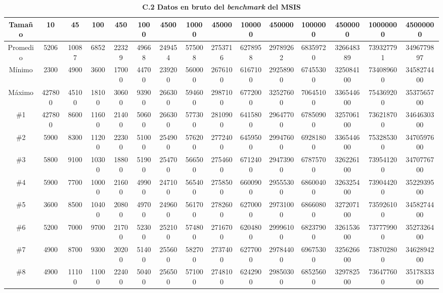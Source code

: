 \documentclass[titlepage]{article}
\begin{document}
\begin{landscape}
	\begin{table}[h]
		\centering
		\smaller
		\caption*{\textbf{C.2 Datos en bruto del \textit{benchmark} del MSIS}}
		\begin{tabular}{|c|c|c|c|c|c|c|c|c|c|c|c|c|c|c|} 
			\hline
			Tamaño   & 10     & 45    & 100   & 450   & 1000  & 4500   & 10000  & 45000   & 100000  & 450000   & 1000000  & 4500000   & 10000000  & 45000000    \\ 
			\hline
			Promedio & 5206   & 10087 & 6852  & 22329 & 49668 & 249454 & 575008 & 2753716 & 6278958 & 29789262 & 68359720 & 326648389 & 739327791 & 3496779897  \\ 
			\hline
			Mínimo   & 2300   & 4900  & 3600  & 17000 & 44700 & 239200 & 560000 & 2676100 & 6167100 & 29258900 & 67455300 & 325084100 & 734089600 & 3458274400  \\ 
			\hline
			Máximo   & 427800 & 45100 & 18100 & 30600 & 93900 & 266300 & 594600 & 2987100 & 6772000 & 32527600 & 70645100 & 336544600 & 754369200 & 3537565700  \\ 
			\hline
			\#1      & 427800 & 8600  & 11600 & 21400 & 50600 & 266300 & 577300 & 2810900 & 6415800 & 29647700 & 67850900 & 325706100 & 736218700 & 3464630300  \\ 
			\hline
			\#2      & 5900   & 8300  & 11200 & 22300 & 51000 & 254900 & 576200 & 2772400 & 6459500 & 29947600 & 69281800 & 336544600 & 753285300 & 3470597600  \\ 
			\hline
			\#3      & 5800   & 9100  & 10300 & 18800 & 51900 & 254700 & 566500 & 2754600 & 6712400 & 29473900 & 67875700 & 326226100 & 739541200 & 3470776700  \\ 
			\hline
			\#4      & 5900   & 7700  & 10000 & 21600 & 49900 & 247100 & 565400 & 2758500 & 6600900 & 29555300 & 68600400 & 326325400 & 739044200 & 3522939500  \\ 
			\hline
			\#5      & 3600   & 8500  & 10400 & 20800 & 49700 & 249600 & 561700 & 2782600 & 6270000 & 29731000 & 68660800 & 327207100 & 735926100 & 3458274400  \\ 
			\hline
			\#6      & 5200   & 7000  & 9700  & 21700 & 52300 & 252100 & 574800 & 2716700 & 6204800 & 29996100 & 68237900 & 326153600 & 737779900 & 3527326400  \\ 
			\hline
			\#7      & 4900   & 8700  & 9300  & 20200 & 51400 & 255600 & 582700 & 2737400 & 6277000 & 29784400 & 69675300 & 325626600 & 738702800 & 3462894200  \\ 
			\hline
			\#8      & 4900   & 11100 & 11000 & 22400 & 50400 & 256500 & 571000 & 2748100 & 6242900 & 29850300 & 68525600 & 329782500 & 736477600 & 3517833300  \\ 

\end{tabular}
\end{table}
\end{landscape}
\end{document}
